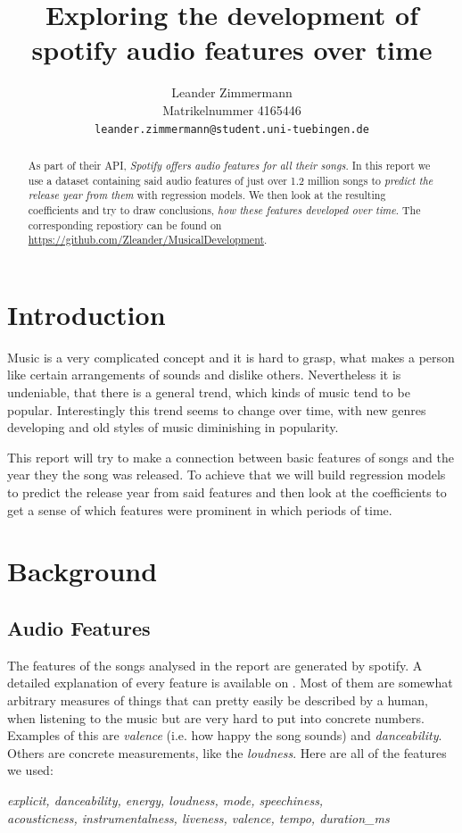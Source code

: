 \documentclass{article}
\title{Exploring the development of spotify audio features over time}
\author{%
  Leander Zimmermann\\
  Matrikelnummer 4165446\\
  \texttt{leander.zimmermann@student.uni-tuebingen.de} \\
}
\begin{document}
\maketitle

\begin{abstract}
    As part of their API, \emph{Spotify offers audio features for all their songs}. In this report we use a dataset \citep{dataset} containing said audio features of just over 1.2 million songs to \emph{predict the release year from them} with regression models. We then look at the resulting coefficients and try to draw conclusions, \emph{how these features developed over time}. The corresponding repostiory can be found on \url{https://github.com/Zleander/MusicalDevelopment}.
\end{abstract}

\section{Introduction}

Music is a very complicated concept and it is hard to grasp, what makes a person like certain arrangements of sounds and dislike others. Nevertheless it is undeniable, that there is a general trend, which kinds of music tend to be popular. Interestingly this trend seems to change over time, with new genres developing and old styles of music diminishing in popularity.

This report will try to make a connection between basic features of songs and the year they the song was released. To achieve that we will build regression models to predict the release year from said features and then look at the coefficients to get a sense of which features were prominent in which periods of time.

\section{Background}
\subsection{Audio Features}\label{sec:features}
The features of the songs analysed in the report are generated by spotify. A detailed explanation of every feature is available on \cite{spotify_audio_features}.
Most of them are somewhat arbitrary measures of things that can pretty easily be described by a human, when listening to the music but are very hard to put into concrete numbers. Examples of this are \emph{valence} (i.e. how happy the song sounds) and \emph{danceability}. Others are concrete measurements, like the \emph{loudness}. Here are all of the features we used: 
\begin{center}
  \emph{explicit, danceability, energy, loudness, mode, speechiness, \\ acousticness, instrumentalness, liveness, valence, tempo, duration\_ms}
\end{center}
\end{document}
